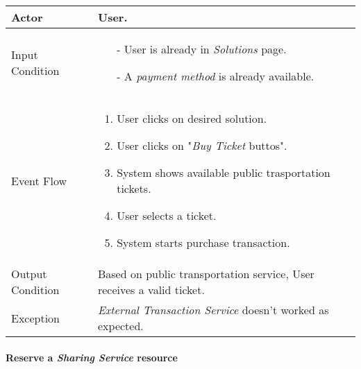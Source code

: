 		\begin{tabular}{| l | p{} | }
			\hline
			\hline
			Actor	&		User. \\
			\hline
			Input Condition		&		\begin{itemize}
													\item[-] User is already in \textit{Solutions} page.
													\item[-] A \textit{payment method} is already available.
												\end{itemize} \\
			\hline
			Event Flow		&		\begin{enumerate}
												\item User clicks on desired solution.
												\item User clicks on "\textit{Buy Ticket} buttos".
												\item System shows available public trasportation tickets.
												\item User selects a ticket.
												\item	 System starts purchase transaction.
											\end{enumerate} \\
			\hline
			Output Condition		&		Based on public transportation service, User receives a valid ticket. \\
			\hline		
			Exception		&		\textit{External Transaction Service} doesn't worked as expected. \\
			\hline
			\hline
		\end{tabular}


	\paragraph{Reserve a \textit{Sharing Service} resource} \label{sharing_useCase}
	
